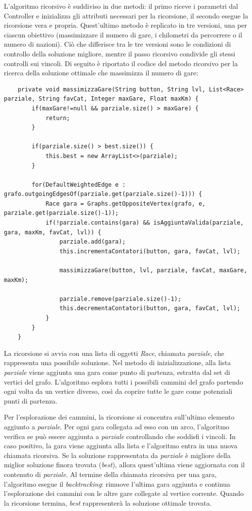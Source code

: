 \documentclass[a4paper, 12pt, oneside]{book}
\begin{document}
L'algoritmo ricorsivo è suddiviso in due metodi: il primo riceve i parametri dal Controller e inizializza gli attributi necessari per la ricorsione, il secondo esegue la ricorsione vera e propria. Quest'ultimo metodo è replicato in tre versioni, una per ciascun obiettivo (massimizzare il numero di gare, i chilometri da percorrere o il numero di nazioni). Ciò che differisce tra le tre versioni sono le condizioni di controllo della soluzione migliore, mentre il passo ricorsivo condivide gli stessi controlli sui vincoli. Di seguito è riportato il codice del metodo ricorsivo per la ricerca della soluzione ottimale che massimizza il numero di gare: 
\begin{lstlisting}
    private void massimizzaGare(String button, String lvl, List<Race> parziale, String favCat, Integer maxGare, Float maxKm) {
		if(maxGare!=null && parziale.size() > maxGare) {
			return;
		}
		
		if(parziale.size() > best.size()) {
			this.best = new ArrayList<>(parziale);
		}
		
		for(DefaultWeightedEdge e : grafo.outgoingEdgesOf(parziale.get(parziale.size()-1))) {
			Race gara = Graphs.getOppositeVertex(grafo, e, parziale.get(parziale.size()-1));
			if(!parziale.contains(gara) && isAggiuntaValida(parziale, gara, maxKm, favCat, lvl)) {
				parziale.add(gara);
				this.incrementaContatori(button, gara, favCat, lvl);
				
				massimizzaGare(button, lvl, parziale, favCat, maxGare, maxKm);
				
				parziale.remove(parziale.size()-1);
				this.decrementaContatori(button, gara, favCat, lvl);
			}
		}
	}
\end{lstlisting}
La ricorsione si avvia con una lista di oggetti \textit{Race}, chiamata \textit{parziale}, che rappresenta una possibile soluzione. Nel metodo di inizializzazione, alla lista \textit{parziale} viene aggiunta una gara come punto di partenza, estratta dal set di vertici del grafo. L'algoritmo esplora tutti i possibili cammini del grafo partendo ogni volta da un vertice diverso, così da coprire tutte le gare come potenziali punti di partenza. 

Per l'esplorazione dei cammini, la ricorsione si concentra sull'ultimo elemento aggiunto a \textit{parziale}. Per ogni gara collegata ad esso con un arco, l'algoritmo verifica se può essere aggiunta a \textit{parziale} controllando che soddisfi i vincoli. In caso positivo, la gara viene aggiunta alla lista e l'algoritmo entra in una nuova chiamata ricorsiva. Se la soluzione rappresentata da \textit{parziale} è migliore della miglior soluzione finora trovata (\textit{best}), allora quest'ultima viene aggiornata con il contenuto di \textit{parziale}. Al termine della chiamata ricorsiva per una gara, l'algoritmo esegue il \textit{backtracking}: rimuove l'ultima gara aggiunta e continua l'esplorazione dei cammini con le altre gare collegate al vertice corrente. Quando la ricorsione termina, \textit{best} rappresenterà la soluzione ottimale trovata.
\end{document}
